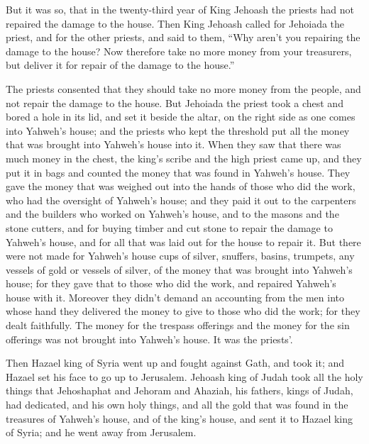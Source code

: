 \begin{paracol}{2}
\begin{otherlanguage}{english}
 But it was so, that in the twenty-third year of King
Jehoash the priests had not repaired the damage to the house.
 Then King Jehoash called for Jehoiada the priest, and for
the other priests, and said to them, ``Why aren't you repairing the
damage to the house? Now therefore take no more money from your
treasurers, but deliver it for repair of the damage to the house.''

 The priests consented that they should take no more money
from the people, and not repair the damage to the house. 
But Jehoiada the priest took a chest and bored a hole in its lid, and
set it beside the altar, on the right side as one comes into Yahweh's
house; and the priests who kept the threshold put all the money that was
brought into Yahweh's house into it.  When they saw that
there was much money in the chest, the king's scribe and the high priest
came up, and they put it in bags and counted the money that was found in
Yahweh's house.  They gave the money that was weighed out
into the hands of those who did the work, who had the oversight of
Yahweh's house; and they paid it out to the carpenters and the builders
who worked on Yahweh's house,  and to the masons and the
stone cutters, and for buying timber and cut stone to repair the damage
to Yahweh's house, and for all that was laid out for the house to repair
it.  But there were not made for Yahweh's house cups of
silver, snuffers, basins, trumpets, any vessels of gold or vessels of
silver, of the money that was brought into Yahweh's house;
 for they gave that to those who did the work, and
repaired Yahweh's house with it.  Moreover they didn't
demand an accounting from the men into whose hand they delivered the
money to give to those who did the work; for they dealt faithfully.
 The money for the trespass offerings and the money for
the sin offerings was not brought into Yahweh's house. It was the
priests'.

 Then Hazael king of Syria went up and fought against
Gath, and took it; and Hazael set his face to go up to Jerusalem.
 Jehoash king of Judah took all the holy things that
Jehoshaphat and Jehoram and Ahaziah, his fathers, kings of Judah, had
dedicated, and his own holy things, and all the gold that was found in
the treasures of Yahweh's house, and of the king's house, and sent it to
Hazael king of Syria; and he went away from Jerusalem.


\end{otherlanguage}
\end{paracol}
